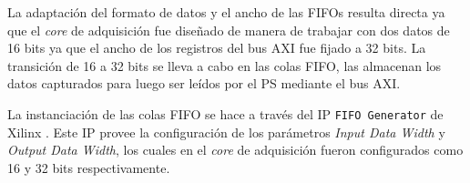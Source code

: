 \documentclass[../../main.tex]{subfiles}
\begin{document}

\begin{table}[H]
    \centering
    \caption{Diferencias a salvar para lograr la integración de la etapa de preprocesamiento.}\label{tab::diferencias-integracion}
    \end{table}

La adaptación del formato de datos y el ancho de las FIFOs resulta directa ya que el \textit{core} de adquisición fue diseñado de manera de trabajar con dos datos de 16 bits ya que el ancho de los registros del bus AXI fue fijado a 32 bits. La transición de 16 a 32 bits se lleva a cabo en las colas FIFO, las almacenan los datos capturados para luego ser leídos por el PS mediante el bus AXI.

La instanciación de las colas FIFO se hace a través del IP \texttt{FIFO Generator} de Xilinx \cite{fifo-generator}. Este IP provee la configuración de los parámetros \textit{Input Data Width} y \textit{Output Data Width}, los cuales en el \textit{core} de adquisición fueron configurados como 16 y 32 bits respectivamente.
\end{document}
